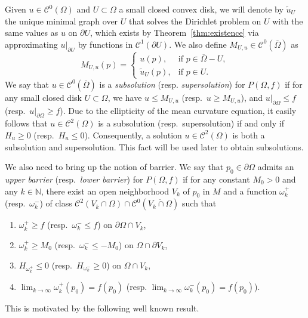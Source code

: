 \documentclass[a4paper,10pt,reqno]{amsart}
\newcommand{\sm}{-}
\theoremstyle{definition}
\theoremstyle{remark}
\numberwithin{equation}{section}
\begin{document}
Given $u\in\mathcal C^0(\Omega)$ and $U\subset\Omega$ a small closed convex disk, we will denote by $\tilde{u}_U$ the unique minimal graph over $U$ that solves the Dirichlet problem on $U$ with the same values as $u$ on $\partial U$, which exists by Theorem~\ref{thm:existence} via approximating $u|_{\partial U}$ by functions in $\mathcal C^1(\partial U)$. We also define $M_{U,u}\in\mathcal C^0(\overline\Omega)$ as
\[M_{U,u}(p)=
	\begin{cases}
		u(p), & \text{if } p\in \overline{\Omega}\sm U,\\
		\tilde{u}_U(p), & \text{if } p\in U.
	\end{cases}\] 
We say that $u\in\mathcal{C}^0(\overline{\Omega})$ is a \emph{subsolution} (resp. \emph{supersolution}) for $P(\Omega,f)$ if for any  small closed  disk $U\subset \Omega$, we have $u\leq M_{U,u}$ (resp.\ $u\geq M_{U,u}$),
and $u|_{\partial \Omega}\leq f$ (resp.\ $u|_{\partial \Omega}\geq f$). Due to the ellipticity of the mean curvature equation, it easily follows that $u\in\mathcal{C}^2(\Omega)$ is a subsolution (resp.\ supersolution) if and only if $H_u\geq 0$ (resp.\ $H_u\leq 0$). Consequently, a solution $u\in\mathcal{C}^2(\Omega)$ is both a subsolution and supersolution. This fact will be used later to obtain subsolutions.

We also need to bring up the notion of barrier. We say that $p_0\in\partial\Omega$ admits an \emph{upper barrier} (resp.\ \emph{lower barrier}) for $P(\Omega,f)$ if for any constant $M_0>0$ and any $k\in\mathbb N$, there exist an open neighborhood $V_k$ of $p_0$ in $M$ and a function $\omega^+_k$ (resp.\ $\omega^-_k$) of class $\mathcal{C}^2(V_k\cap\Omega)\cap\mathcal{C}^0(\overline{V_k\cap \Omega})$ such that
\begin{enumerate}[label=(\roman*)]
	\item $\omega^+_k\geq f$ (resp.\ $\omega^-_k\leq f$) on $\partial \Omega\cap V_k$,
	
	\item $\omega^+_k\geq M_0$ (resp.\ $\omega^-_k\leq -M_0$) on $\Omega\cap \partial V_k$,
	
	\item $H_{\omega^+_k}\leq 0$ (resp.\ $H_{\omega^-_k}\geq 0$) on $\Omega\cap V_k$,
		
	\item $\lim_{k\to\infty}\omega^+_k(p_0)=f(p_0)$
		(resp.  $\lim_{k\to\infty}\omega^-_k(p_0)=f(p_0)$).
\end{enumerate}
This is motivated by the following well known result.
	
\end{document}
